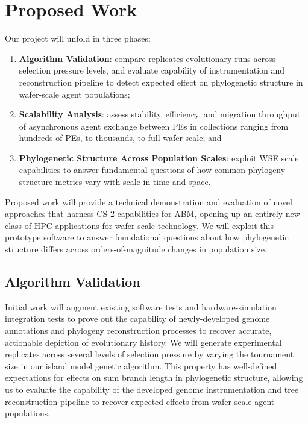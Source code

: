 \section{Proposed Work} \label{sec:objectives}

Our project will unfold in three phases:
\begin{enumerate}
\item \textbf{Algorithm Validation}: compare replicates evolutionary runs across selection pressure levels, and evaluate capability of instrumentation and reconstruction pipeline to detect expected effect on phylogenetic structure in wafer-scale agent populations;
\item \textbf{Scalability Analysis}: assess stability, efficiency, and migration throughput of asynchronous agent exchange between PEs in collections ranging from hundreds of PEs, to thousands, to full wafer scale; and
\item \textbf{Phylogenetic Structure Across Population Scales}: exploit WSE scale capabilities to answer fundamental questions of how common phylogeny structure metrics vary with scale in time and space.
\end{enumerate}

Proposed work will provide a technical demonstration and evaluation of novel approaches that harness CS-2 capabilities for ABM, opening up an entirely new class of HPC applications for wafer scale technology.
We will exploit this prototype software to answer foundational questions about how phylogenetic structure differs across orders-of-magnitude changes in population size.

\subsection{Algorithm Validation}

Initial work will augment existing software tests and hardware-simulation integration tests to prove out the capability of newly-developed genome annotations and phylogeny reconstruction processes to recover accurate, actionable depiction of evolutionary history.
We will generate experimental replicates across several levels of selection pressure by varying the tournament size in our island model genetic algorithm.
This property has well-defined expectations for effects on sum branch length in phylogenetic structure, allowing us to evaluate the capability of the developed genome instrumentation and tree reconstruction pipeline to recover expected effects from wafer-scale agent populations.

